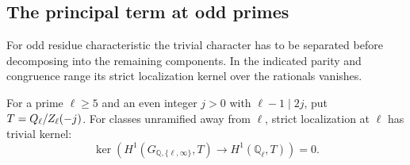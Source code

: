 

\subsection{The principal term at odd primes}

For odd residue characteristic the trivial character has to be separated before decomposing into the remaining components. In the indicated parity and congruence range its strict localization kernel over the rationals vanishes.

\begin{lemma}\label{lem:principal-odd-strict-zero}
For a prime \(\ell\ge5\) and an even integer \(j>0\) with
\(\ell-1\mid2j\), put \(T=Q_\ell/Z_\ell(-j)\). For classes unramified away from \(\ell\), strict localization at \(\ell\) has trivial kernel: 
\[
 \ker\!\left(H^1(G_{\mathbb Q,\{\ell,\infty\}},T)\longrightarrow H^1(\mathbb Q_\ell,T)\right)=0.
\]

\end{lemma}

